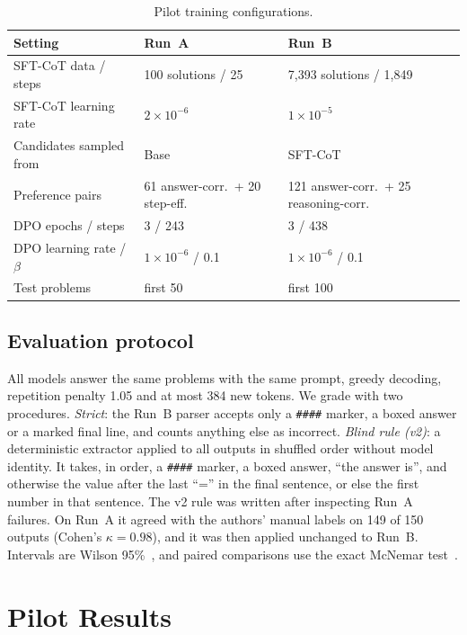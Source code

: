 \documentclass[11pt, a4paper]{article}
\begin{document}
\begin{table}[t]
\centering
\caption{Pilot training configurations.}
\label{tab:hparams}
\small
\begin{tabular}{lll}
\toprule
\textbf{Setting} & \textbf{Run~A} & \textbf{Run~B} \\
\midrule
SFT-CoT data / steps & 100 solutions / 25 & 7{,}393 solutions / 1{,}849 \\
SFT-CoT learning rate & $2\times10^{-6}$ & $1\times10^{-5}$ \\
Candidates sampled from & Base & SFT-CoT \\
Preference pairs & 61 answer-corr.\ + 20 step-eff. & 121 answer-corr.\ + 25 reasoning-corr. \\
DPO epochs / steps & 3 / 243 & 3 / 438 \\
DPO learning rate / $\beta$ & $1\times10^{-6}$ / 0.1 & $1\times10^{-6}$ / 0.1 \\
Test problems & first 50 & first 100 \\
\bottomrule
\end{tabular}
\end{table}

\subsection{Evaluation protocol}
All models answer the same problems with the same prompt, greedy decoding, repetition penalty 1.05 and at most 384 new tokens. We grade with two procedures. \emph{Strict}: the Run~B parser accepts only a \texttt{\#\#\#\#} marker, a boxed answer or a marked final line, and counts anything else as incorrect. \emph{Blind rule (v2)}: a deterministic extractor applied to all outputs in shuffled order without model identity. It takes, in order, a \texttt{\#\#\#\#} marker, a boxed answer, ``the answer is'', and otherwise the value after the last ``='' in the final sentence, or else the first number in that sentence. The v2 rule was written after inspecting Run~A failures. On Run~A it agreed with the authors' manual labels on 149 of 150 outputs (Cohen's $\kappa=0.98$), and it was then applied unchanged to Run~B. Intervals are Wilson 95\%~\cite{wilson1927probable}, and paired comparisons use the exact McNemar test~\cite{mcnemar1947note}.

\section{Pilot Results}
\label{sec:results}
\end{document}
